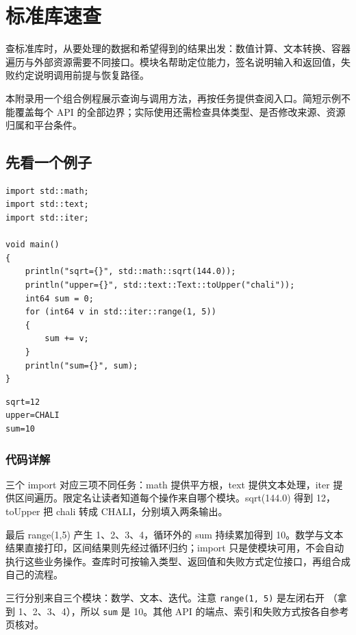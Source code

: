\chapter{标准库速查}
\label{ch:appB}

查标准库时，从要处理的数据和希望得到的结果出发：数值计算、文本转换、容器遍历与外部资源需要不同接口。模块名帮助定位能力，签名说明输入和返回值，失败约定说明调用前提与恢复路径。

本附录用一个组合例程展示查询与调用方法，再按任务提供查阅入口。简短示例不能覆盖每个 API 的全部边界；实际使用还需检查具体类型、是否修改来源、资源归属和平台条件。

\section{先看一个例子}

\par
\medskip
\begin{lstlisting}[style=chali]
import std::math;
import std::text;
import std::iter;

void main()
{
    println("sqrt={}", std::math::sqrt(144.0));
    println("upper={}", std::text::Text::toUpper("chali"));
    int64 sum = 0;
    for (int64 v in std::iter::range(1, 5))
    {
        sum += v;
    }
    println("sum={}", sum);
}
\end{lstlisting}
\par
\medskip

\par
\medskip
\begin{lstlisting}[style=out]
sqrt=12
upper=CHALI
sum=10
\end{lstlisting}
\par
\medskip

\subsection*{代码详解}

三个 import 对应三项不同任务：math 提供平方根，text 提供文本处理，iter 提供区间遍历。限定名让读者知道每个操作来自哪个模块。sqrt(144.0) 得到 12，toUpper 把 chali 转成 CHALI，分别填入两条输出。

最后 range(1,5) 产生 1、2、3、4，循环外的 sum 持续累加得到 10。数学与文本结果直接打印，区间结果则先经过循环归约；import 只是使模块可用，不会自动执行这些业务操作。查库时可按输入类型、返回值和失败方式定位接口，再组合成自己的流程。

三行分别来自三个模块：数学、文本、迭代。注意 \texttt{range(\allowbreak{}1,\allowbreak{} 5)\allowbreak{}} 是左闭右开 （拿到 1、2、3、4），所以 \texttt{sum} 是 10。其他 API 的端点、索引和失败方式按各自参考页核对。

